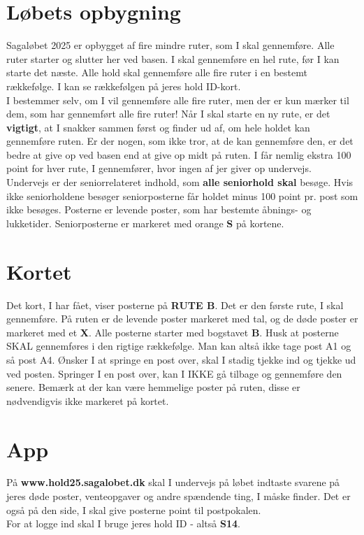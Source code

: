 \section{Løbets opbygning}
Sagaløbet 2025 er opbygget af fire mindre ruter, som I skal gennemføre. Alle ruter starter og slutter her ved basen. I skal gennemføre en hel rute, før I kan starte det næste. Alle hold skal gennemføre alle fire ruter i en bestemt rækkefølge. I kan se rækkefølgen på jeres hold ID-kort.\\\newline
I bestemmer selv, om I vil gennemføre alle fire ruter, men der er kun mærker til dem, som har gennemført alle fire ruter! Når I skal starte en ny rute, er det \textbf{vigtigt}, at I snakker sammen først og finder ud af, om hele holdet kan gennemføre ruten. Er der nogen, som ikke tror, at de kan gennemføre den, er det bedre at give op ved basen end at give op midt på ruten. I får nemlig ekstra 100 point for hver rute, I gennemfører, hvor ingen af jer giver op undervejs.\\
\newline
Undervejs er der seniorrelateret indhold, som \textbf{alle seniorhold skal} besøge. Hvis ikke seniorholdene besøger seniorposterne får holdet minus 100 point pr. post som ikke besøges. Posterne er levende poster, som har bestemte åbnings- og lukketider. Seniorposterne er markeret med orange \textbf{S} på kortene.\\
\newline
\section{Kortet}
Det kort, I har fået, viser posterne på \textbf{RUTE B}. Det er den første rute, I skal gennemføre. På ruten er de levende poster markeret med tal, og de døde poster er markeret med et \textbf{X}. Alle posterne starter med bogstavet \textbf{B}. Husk at posterne SKAL gennemføres i den rigtige rækkefølge. Man kan altså ikke tage post A1 og så post A4. Ønsker I at springe en post over, skal I stadig tjekke ind og tjekke ud ved posten. Springer I en post over, kan I IKKE gå tilbage og gennemføre den senere. Bemærk at der kan være hemmelige poster på ruten, disse er nødvendigvis ikke markeret på kortet.
\section{App}
På \textbf{www.hold25.sagalobet.dk} skal I undervejs på løbet indtaste svarene på jeres døde poster, venteopgaver og andre spændende ting, I måske finder. Det er også på den side, I skal give posterne point til postpokalen.\\
For at logge ind skal I bruge jeres hold ID - altså \textbf{S14}.
\newpage
